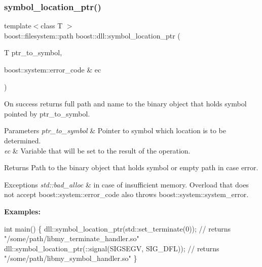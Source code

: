 \subsubsection{\texorpdfstring{symbol\+\_\+location\+\_\+ptr()}{symbol\_location\_ptr()}\hspace{0.1cm}{\footnotesize\ttfamily [1/2]}}
{\footnotesize\ttfamily template$<$class T $>$ \\
boost\+::filesystem\+::path boost\+::dll\+::symbol\+\_\+location\+\_\+ptr (\begin{DoxyParamCaption}\item[{T}]{ptr\+\_\+to\+\_\+symbol,  }\item[{boost\+::system\+::error\+\_\+code \&}]{ec }\end{DoxyParamCaption})\hspace{0.3cm}{\ttfamily [inline]}}

On success returns full path and name to the binary object that holds symbol pointed by ptr\+\_\+to\+\_\+symbol.


\begin{DoxyParams}{Parameters}
{\em ptr\+\_\+to\+\_\+symbol} & Pointer to symbol which location is to be determined. \\
\hline
{\em ec} & Variable that will be set to the result of the operation. \\
\hline
\end{DoxyParams}
\begin{DoxyReturn}{Returns}
Path to the binary object that holds symbol or empty path in case error. 
\end{DoxyReturn}

\begin{DoxyExceptions}{Exceptions}
{\em std\+::bad\+\_\+alloc} & in case of insufficient memory. Overload that does not accept boost\+::system\+::error\+\_\+code also throws boost\+::system\+::system\+\_\+error.\\
\hline
\end{DoxyExceptions}
{\bfseries Examples\+:} 
\begin{DoxyCode}
\textcolor{keywordtype}{int} main() \{
   dll::symbol\_location\_ptr(std::set\_terminate(0));       \textcolor{comment}{// returns
       "/some/path/libmy\_terminate\_handler.so"}
   dll::symbol\_location\_ptr(::signal(SIGSEGV, SIG\_DFL));  \textcolor{comment}{// returns "/some/path/libmy\_symbol\_handler.so"}
\}
\end{DoxyCode}
 \mbox{\label{a00266_file_ae6aac347e0e9cbae31c26f52ebb0ce85}} 
